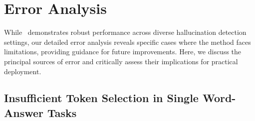 \section{Error Analysis}
\label{sec:error_analysis}

While \method~demonstrates robust performance across diverse hallucination detection settings, our detailed error analysis reveals specific cases where the method faces limitations, providing guidance for future improvements. Here, we discuss the principal sources of error and critically assess their implications for practical deployment.

\subsection{Insufficient Token Selection in Single Word-Answer Tasks}

